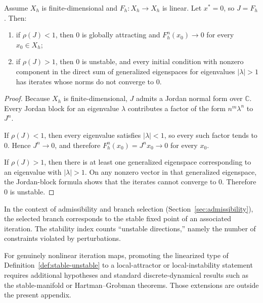 \begin{lemma}
\label{lem:stability-criterion}
Assume \(X_h\) is finite-dimensional and \(F_h : X_h \to X_h\) is linear.
Let \(x^* = 0\), so \(J = F_h\).
Then:
\begin{enumerate}[label=(\roman*)]
\item if \(\rho(J) < 1\), then \(0\) is globally attracting and
      \(F_h^n(x_0) \to 0\) for every \(x_0 \in X_h\);
\item if \(\rho(J) > 1\), then \(0\) is unstable, and every initial condition
      with nonzero component in the direct sum of generalized eigenspaces for
      eigenvalues \(|\lambda| > 1\) has iterates whose norms do not converge to
      \(0\).
\end{enumerate}
\end{lemma}

\begin{proof}
Because \(X_h\) is finite-dimensional, \(J\) admits a Jordan normal form over
\(\mathbb C\). Every Jordan block for an eigenvalue \(\lambda\) contributes a
factor of the form \(n^m \lambda^n\) to \(J^n\).

If \(\rho(J) < 1\), then every eigenvalue satisfies \(|\lambda| < 1\), so
every such factor tends to \(0\). Hence \(J^n \to 0\), and therefore
\(F_h^n(x_0) = J^n x_0 \to 0\) for every \(x_0\).

If \(\rho(J) > 1\), then there is at least one generalized eigenspace
corresponding to an eigenvalue with \(|\lambda| > 1\). On any nonzero vector in
that generalized eigenspace, the Jordan-block formula shows that the iterates
cannot converge to \(0\). Therefore \(0\) is unstable.
\end{proof}

\begin{remark}
In the context of admissibility and branch selection (Section~\ref{sec:admissibility}), the selected branch corresponds to the stable fixed point of an associated iteration.
The stability index counts ``unstable directions,'' namely the number of
constraints violated by perturbations.
\end{remark}

\begin{remark}
For genuinely nonlinear iteration maps, promoting the linearized type of
Definition~\ref{def:stable-unstable} to a local-attractor or local-instability
statement requires additional hypotheses and standard discrete-dynamical
results such as the stable-manifold or Hartman--Grobman theorems. Those
extensions are outside the present appendix.
\end{remark}

